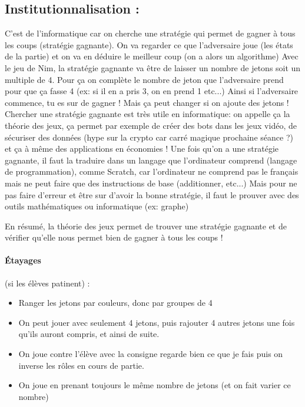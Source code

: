 \documentclass[12pt, a4paper]{article}
\begin{document}
\newpage
	
\subsection*{Institutionnalisation :}
	
C'est de l'informatique car on cherche une stratégie qui permet de gagner à tous les coups (stratégie gagnante). On va regarder ce que l'adversaire joue (les états de la partie) et on va en déduire le meilleur coup (on a alors un algorithme)
Avec le jeu de Nim, la stratégie gagnante va être de laisser un nombre de jetons soit un multiple de 4. Pour ça on complète le nombre de jeton que l'adversaire prend pour que ça fasse 4 (ex: si il en a pris 3, on en prend 1 etc...)
Ainsi si l'adversaire commence, tu es sur de gagner ! Mais ça peut changer si on ajoute des jetons !
Chercher une stratégie gagnante est très utile en informatique: on appelle ça la théorie des jeux, ça permet par exemple de créer des bots dans les jeux vidéo, de sécuriser des données (hype sur la crypto car carré magique prochaine séance ?) et ça à même des applications en économies !
Une fois qu'on a une stratégie gagnante, il faut la traduire dans un langage que l'ordinateur comprend (langage de programmation), comme Scratch, car l'ordinateur ne comprend pas le français mais ne peut faire que des instructions de base (additionner, etc...)
Mais pour ne pas faire d'erreur et être sur d'avoir la bonne stratégie, il faut le prouver avec des outils mathématiques ou informatique (ex: graphe) 

En résumé, la théorie des jeux permet de trouver une stratégie gagnante et de vérifier qu'elle nous permet bien de gagner à tous les coups !
	
	\paragraph*{Étayages} (si les élèves patinent) :
	\begin{itemize}
		\item Ranger les jetons par couleurs, donc par groupes de 4
		\item On peut jouer avec seulement 4 jetons, puis rajouter 4 autres jetons une fois qu'ils auront compris,
		et ainsi de suite.
		\item On joue contre l'élève
		avec la consigne \og regarde bien ce que je fais\fg{}
		puis on inverse les rôles en cours de partie.
		\item On joue en prenant toujours le même nombre de jetons (et on fait varier ce nombre)
	\end{itemize}
	
\end{document}
